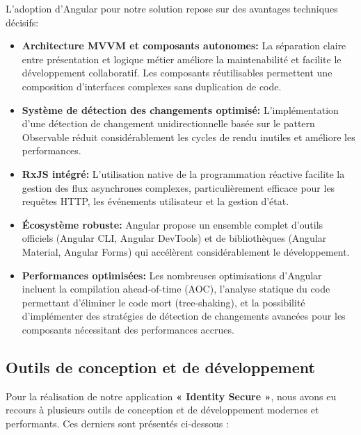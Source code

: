  \vspace{1cm}
 
 L'adoption d'Angular pour notre solution repose sur des avantages techniques décisifs:
 
 \begin{itemize}
    \item \textbf{Architecture MVVM et composants autonomes:} La séparation claire entre présentation et logique métier améliore la maintenabilité et facilite le développement collaboratif. Les composants réutilisables permettent une composition d'interfaces complexes sans duplication de code.
     
    \item \textbf{Système de détection des changements optimisé:} L'implémentation d'une détection de changement unidirectionnelle basée sur le pattern Observable réduit considérablement les cycles de rendu inutiles et améliore les performances.
    
    \item \textbf{RxJS intégré:} L'utilisation native de la programmation réactive facilite la gestion des flux asynchrones complexes, particulièrement efficace pour les requêtes HTTP, les événements utilisateur et la gestion d'état.
     
    \item \textbf{Écosystème robuste:} Angular propose un ensemble complet d'outils officiels (Angular CLI, Angular DevTools) et de bibliothèques (Angular Material, Angular Forms) qui accélèrent considérablement le développement.
     
    \item \textbf{Performances optimisées:} Les nombreuses optimisations d'Angular incluent la compilation ahead-of-time (AOC), l'analyse statique du code permettant d'éliminer le code mort (tree-shaking), et la possibilité d'implémenter des stratégies de détection de changements avancées pour les composants nécessitant des performances accrues.
 \end{itemize}



 \subsection{Outils de conception et de développement}
Pour la réalisation de notre application \textbf{« Identity Secure »}, nous avons eu recours à plusieurs outils de conception et de développement modernes et performants. Ces derniers sont présentés ci-dessous :

